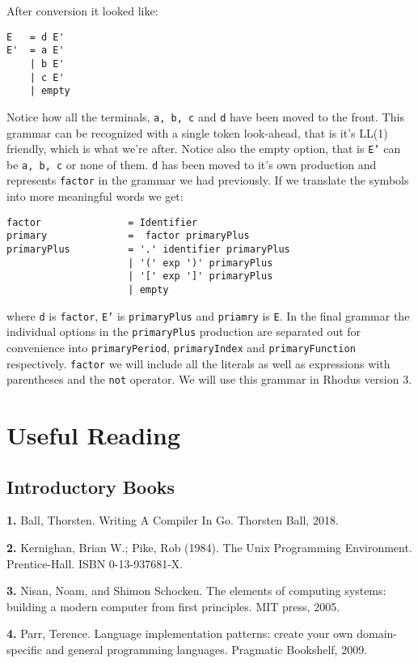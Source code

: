 After conversion it looked like:
%
{\footnotesize
\begin{verbatim}
E   = d E'
E'  = a E'
    | b E'
    | c E'
    | empty
\end{verbatim} }
%
Notice how all the terminals, {\tt a, b, c} and {\tt d} have been moved to the front. This grammar can be recognized with a single token look-ahead, that is it's LL(1) friendly, which is what we're after. Notice also the empty option, that is {\tt E'} can be {\tt a, b, c} or none of them. {\tt d} has been moved to it's own production and represents {\tt factor} in the grammar we had previously. If we translate the symbols into more meaningful words we get:
%
{\footnotesize
\begin{verbatim}
factor               = Identifier
primary              =  factor primaryPlus
primaryPlus          = '.' identifier primaryPlus
                     | '(' exp ')' primaryPlus
                     | '[' exp ']' primaryPlus
                     | empty
\end{verbatim} }
%
where {\tt d} is {\tt factor}, {\tt E'} is {\tt primaryPlus} and {\tt priamry} is {\tt E}.  In the final grammar the individual options in the {\tt primaryPlus} production are separated out for convenience into {\tt primaryPeriod}, {\tt primaryIndex} and {\tt primaryFunction} respectively. {\tt factor} we will include all the literals as well as expressions with parentheses and the {\tt not} operator. We will use this grammar in Rhodus version 3.


\section{Useful Reading}

\subsection{Introductory Books}

{\bf 1.} Ball, Thorsten. Writing A Compiler In Go. Thorsten Ball, 2018.

{\bf 2.} Kernighan, Brian W.; Pike, Rob (1984). The Unix Programming Environment. Prentice-Hall. ISBN 0-13-937681-X.

{\bf 3.} Nisan, Noam, and Shimon Schocken. The elements of computing systems: building a modern computer from first principles. MIT press, 2005.

{\bf 4.} Parr, Terence. Language implementation patterns: create your own domain-specific and general programming languages. Pragmatic Bookshelf, 2009.

